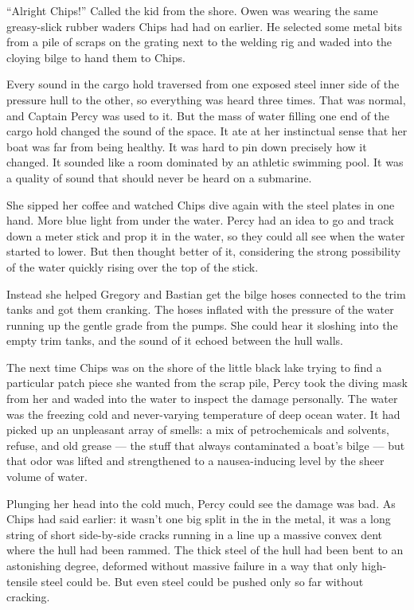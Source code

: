 \documentclass[]{article}
\begin{document}
\begin{multicols}{2}
``Alright Chips!'' Called the kid from the shore. Owen was wearing the
same greasy-slick rubber waders Chips had had on earlier. He selected
some metal bits from a pile of scraps on the grating next to the welding
rig and waded into the cloying bilge to hand them to Chips.

Every sound in the cargo hold traversed from one exposed steel inner
side of the pressure hull to the other, so everything was heard three
times. That was normal, and Captain Percy was used to it. But the mass
of water filling one end of the cargo hold changed the sound of the
space. It ate at her instinctual sense that her boat was far from being
healthy. It was hard to pin down precisely how it changed. It sounded
like a room dominated by an athletic swimming pool. It was a quality of
sound that should never be heard on a submarine.

She sipped her coffee and watched Chips dive again with the steel plates
in one hand. More blue light from under the water. Percy had an idea to
go and track down a meter stick and prop it in the water, so they could
all see when the water started to lower. But then thought better of it,
considering the strong possibility of the water quickly rising over the
top of the stick.

Instead she helped Gregory and Bastian get the bilge hoses connected to
the trim tanks and got them cranking. The hoses inflated with the
pressure of the water running up the gentle grade from the pumps. She
could hear it sloshing into the empty trim tanks, and the sound of it
echoed between the hull walls.

The next time Chips was on the shore of the little black lake trying to
find a particular patch piece she wanted from the scrap pile, Percy took
the diving mask from her and waded into the water to inspect the damage
personally. The water was the freezing cold and never-varying
temperature of deep ocean water. It had picked up an unpleasant array of
smells: a mix of petrochemicals and solvents, refuse, and old grease ---
the stuff that always contaminated a boat's bilge --- but that odor was
lifted and strengthened to a nausea-inducing level by the sheer volume
of water.

Plunging her head into the cold much, Percy could see the damage was
bad. As Chips had said earlier: it wasn't one big split in the in the
metal, it was a long string of short side-by-side cracks running in a
line up a massive convex dent where the hull had been rammed. The thick
steel of the hull had been bent to an astonishing degree, deformed
without massive failure in a way that only high-tensile steel could be.
But even steel could be pushed only so far without cracking.


\end{multicols}
\end{document}
